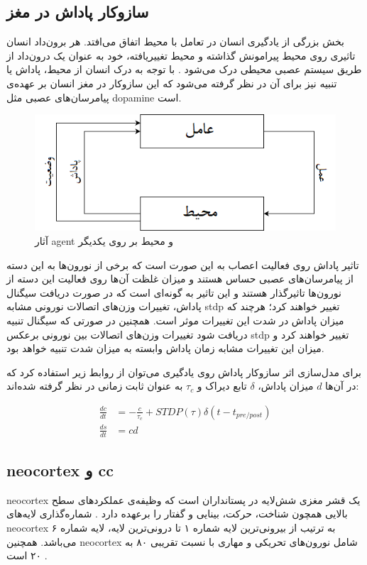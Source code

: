 \documentclass[12pt]{report}
\begin{document}
	\subsection{سازوکار پاداش در مغز}
	\label{section:reward-in-brain}
	
	بخش بزرگی از یادگیری انسان در تعامل با محیط اتفاق می‌افتد. هر برون‌داد انسان تاثیری روی محیط پیرامونش گذاشته و محیط تغییر‌یافته، خود به عنوان یک درون‌داد از طریق سیستم عصبی محیطی درک می‌شود
	\cite{sutton1998reinforcement}.
	با توجه به درک انسان از محیط، پاداش یا تنبیه نیز برای آن در نظر گرفته می‌شود که این ساز‌و‌کار در مغز انسان بر عهده‌ی پیامرسان‌های عصبی  مثل \gls{dopamine} است. 
	
	\begin{figure}[H]
		\centering
		\includegraphics[width=0.7\linewidth]{rl.png}
		\caption[NS]{
			آثار \gls{agent} و محیط بر روی یکدیگر
		}
		\label{fig:rl}
	\end{figure}
	
	تاثیر پاداش روی فعالیت اعصاب به این صورت است که برخی از نورون‌ها به این دسته از پیامرسان‌‌های عصبی حساس هستند و میزان غلظت آن‌ها روی فعالیت این دسته از نورون‌ها تاثیر‌گذار هستند و این تاثیر به گونه‌ای است که در صورت دریافت سیگنال پاداش، تغییرات وزن‌های اتصالات نورونی مشابه \gls{stdp} تغییر خواهند کرد؛ هرچند که میزان پاداش در شدت این تغییرات موثر است. همچنین در صورتی که سیگنال تنبیه دریافت شود تغییرات وزن‌های اتصالات بین نورونی برعکس \gls{stdp} تغییر خواهند کرد و میزان این تغییرات مشابه زمان پاداش وابسته به میزان شدت تنبیه خواهد بود.
	
	برای مدل‌سازی اثر سازوکار پاداش روی یادگیری می‌توان از روابط زیر استفاده کرد که در آن‌ها $d$ میزان پاداش، $\delta$ تابع دیراک و $\tau_c$ به عنوان ثابت زمانی در نظر گرفته‌ شده‌اند:
	
	\begin{align}
		\frac{dc}{dt} &= -\frac{c}{\tau_c} + STDP(\tau) \delta(t-t_{pre/post}) \\
		\frac{ds}{dt} &= cd
		\label{eq:rstdp}
	\end{align}
	
	
	\subsection{\gls{neocortex} و \gls{cc}}
	\gls{neocortex} یک قشر مغزی شش‌لایه در پستانداران است که وظیفه‌ی عملکرد‌های سطح بالایی همچون شناخت، حرکت، بینایی و گفتار را برعهده دارد
	\cite{Lui2011}. شماره‌گذاری لایه‌های \gls{neocortex} به ترتیب از بیرونی‌ترین لایه شماره ۱ تا درونی‌‌ترین لایه، لایه شماره ۶ می‌باشد.
	همچنین \gls{neocortex} شامل نورون‌های تحریکی و مهاری با نسبت تقریبی ۸۰ به ۲۰ است
	\cite{noback2005human}.
	
\end{document}
